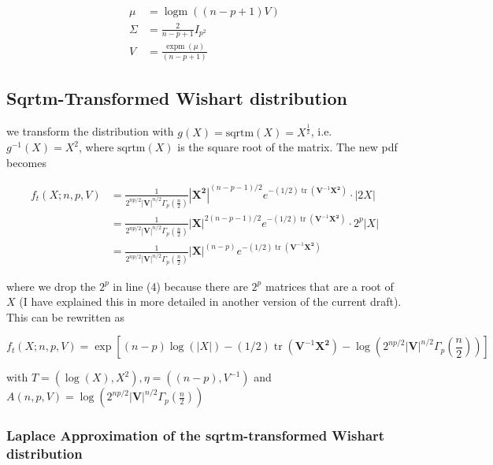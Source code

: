 \begin{align}
	\mu &= \operatorname{logm}((n-p+1)V) \\
	\Sigma &= \frac{2}{n-p+1} I_{p^2} \\
	V &= \frac{\operatorname{expm}(\mu)}{(n-p+1)}
\end{align} 

\subsection{Sqrtm-Transformed Wishart distribution}

we transform the distribution with $g(X) = \text{sqrtm}(X) = X^{\frac{1}{2}}$, i.e. $g^{-1}(X) = X^2$, where $\text{sqrtm}(X)$ is the square root of the matrix. The new pdf becomes

\begin{align}
f_t(X; n,p,V) &= \frac{1}{2^{np/2} \left|{\mathbf V}\right|^{n/2} \Gamma_p\left(\frac {n}{2}\right ) }{\left|\mathbf{X^2}\right|}^{(n-p-1)/2} e^{-(1/2)\operatorname{tr}({\mathbf V}^{-1}\mathbf{X^2})} \cdot |2X| \\ 
&= \frac{1}{2^{np/2} \left|{\mathbf V}\right|^{n/2} \Gamma_p\left(\frac {n}{2}\right ) }{\left|\mathbf{X}\right|}^{2(n-p-1)/2} e^{-(1/2)\operatorname{tr}({\mathbf V}^{-1}\mathbf{X^2})} \cdot 2^p|X| \\
&= \frac{1}{2^{np/2} \left|{\mathbf V}\right|^{n/2} \Gamma_p\left(\frac {n}{2}\right ) }{\left|\mathbf{X}\right|}^{(n-p)} e^{-(1/2)\operatorname{tr}({\mathbf V}^{-1}\mathbf{X^2})} 
\label{eq:wishart_trans_sqrtm_pdf}
\end{align}

where we drop the $2^p$ in line (4) because there are $2^p$ matrices that are a root of $X$ (I have explained this in more detailed in another version of the current draft). This can be rewritten as 

\begin{equation}
f_t(X; n,p,V) = \exp \left[(n-p) \log(|X|) - (1/2)\operatorname{tr}({\mathbf V}^{-1}\mathbf{X^2}) - \log\left(2^{np/2} \left|{\mathbf V}\right|^{n/2} \Gamma_p\left(\frac {n}{2}\right )\right)\right]
\end{equation}

with $T=(\log(X), X^2), \eta=((n-p), V^{-1})$ and $A(n,p,V)=\log\left(2^{np/2} \left|{\mathbf V}\right|^{n/2} \Gamma_p\left(\frac {n}{2}\right )\right)$


\subsubsection{Laplace Approximation of the sqrtm-transformed Wishart distribution}

